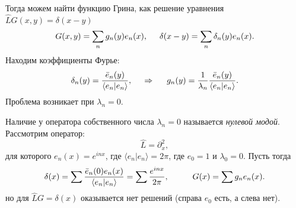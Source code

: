 Тогда можем найти функцию Грина, как решение уравнения $\hat{L} G(x, y) = \delta(x-y)$
\begin{equation*}
    G(x, y) = \sum_n g_n (y) e_n (x),
    \hspace{5 mm} 
    \delta(x-y) = \sum_n \delta_n ( y) e_n (x).
\end{equation*}
Находим коэффициенты Фурье: 
\begin{equation}
    \delta_n (y) = \frac{\bar{e}_n (y)}{\langle e_n | e_n\rangle},
    \hspace{0.5cm} \Rightarrow \hspace{0.5cm}
    g_n (y) = \frac{1}{\lambda_n} \frac{\bar{e}_n (y)}{\langle e_n | e_n\rangle}.
\end{equation}
Проблема возникает при $\lambda_n = 0$. 



Наличие у оператора собственного числа $\lambda_n = 0$ называется \textit{нулевой модой}. Рассмотрим оператор:
\begin{equation*}
    \hat{L} = \partial_x^2,
\end{equation*}
для которого $e_n (x) = e^{i n x}$, где $\langle e_n | e_n\rangle = 2 \pi$, где $e_0 = 1$ и $\lambda_{0} = 0$. Пусть тогда
\begin{equation*}
    \delta(x) = \sum \frac{\bar{e}_n (0) e_n (x)}{\langle e_n | e_n\rangle} = \sum \frac{e^{i n x}}{2 \pi},
    \hspace{10 mm} 
    G(x) = \sum  g_n e_n (x). 
\end{equation*}
но для $\hat{L} G = \delta(x)$ оказывается нет решений (справа $e_0$ есть, а слева нет). 

